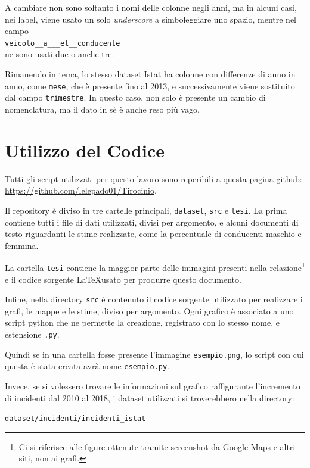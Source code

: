 \documentclass[a4paper]{report}
\newcommand{\columnstyle}[1]{\texttt{#1}}
\newcommand{\filenamestyle}[1]{\texttt{#1}}
\newcommand{\quotestyle}[1]{\textit{#1}}
\newcommand{\skipline}{\vspace{0.2in}}
\begin{document}
A cambiare non sono soltanto i nomi delle colonne negli anni, 
ma in alcuni casi, nei label, viene usato un solo \quotestyle{underscore} a 
simboleggiare uno spazio, mentre nel campo\\
\indent\columnstyle{veicolo\_\_a\_\_\_et\_\_conducente}\\
ne sono usati due o anche tre. 

Rimanendo in tema, lo stesso dataset Istat ha colonne con differenze di anno in anno, 
come \columnstyle{mese}, che è presente fino al 2013, e successivamente viene 
sostituito dal campo \columnstyle{trimestre}. 
In questo caso, non solo è presente un cambio di nomenclatura, ma il dato in sè è 
anche reso più vago. 

\chapter{Utilizzo del Codice}

Tutti gli script utilizzati per questo lavoro sono reperibili a questa pagina 
github: \url{https://github.com/lelepado01/Tirocinio}. 

Il repository è diviso in tre cartelle principali, \filenamestyle{dataset}, \filenamestyle{src} 
e \filenamestyle{tesi}. La prima contiene tutti i file di dati utilizzati, divisi per 
argomento, e alcuni documenti di testo riguardanti le stime realizzate, come la percentuale di 
conducenti maschio e femmina. 

La cartella \columnstyle{tesi} contiene la maggior parte delle immagini presenti 
nella relazione\footnote{Ci si riferisce alle figure ottenute tramite screenshot 
da Google Maps e altri siti, non ai grafi.} 
e il codice sorgente \LaTeX usato per produrre questo documento.

Infine, nella directory \filenamestyle{src} è contenuto il codice sorgente utilizzato 
per realizzare i grafi, le mappe e le stime, diviso per argomento. 
Ogni grafico è associato a uno script python che ne permette la creazione, registrato con 
lo stesso nome, e estensione \filenamestyle{.py}. 

Quindi se in una cartella fosse presente l'immagine \filenamestyle{esempio.png}, lo script con 
cui questa è stata creata avrà nome \filenamestyle{esempio.py}. 

Invece, se si volessero trovare le informazioni sul grafico raffigurante 
l'incremento di incidenti dal 2010 al 2018, i dataset utilizzati si troverebbero 
nella directory:

\skipline
\indent\filenamestyle{dataset/incidenti/incidenti\_istat}
\end{document}
